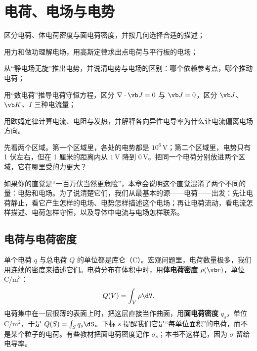 \chapter{电荷、电场与电势}\label{ch:electric}

\begin{chapterguide}
\begin{guidegoals}
\item 区分电荷、体电荷密度与面电荷密度，并按几何选择合适的描述；
\item 用力和做功理解电场，用高斯定律求出点电荷与平行板的电场；
\item 从“静电场无旋”推出电势，并说清电势与电场的区别：哪个依赖参考点，哪个推动电荷；
\item 用“数电荷”推导电荷守恒方程，区分 $\nabla\cdot\vb J=0$ 与 $\vb J=0$，区分 $\vb J$、$\vb K$、$I$ 三种电流量；
\item 用欧姆定律计算电流、电阻与发热，并解释各向异性电导率为什么让电流偏离电场方向。
\end{guidegoals}
\end{chapterguide}

先看两个区域。第一个区域里，各处的电势都是 $10^6\,\mathrm V$；第二个区域里，电势只有 1 伏左右，但在 1 厘米的距离内从 $1\,\mathrm V$ 降到 $0\,\mathrm V$。把同一个电荷分别放进两个区域，它在哪里受的力更大？

如果你的直觉是“一百万伏当然更危险”，本章会说明这个直觉混淆了两个不同的量：电势和电场。为了说清楚它们，我们从最基本的源——电荷——出发：先让电荷静止，看它产生怎样的电场、电势怎样描述这个电场；再让电荷流动，看电流怎样描述、电荷怎样守恒，以及导体中电流与电场怎样联系。

\section{电荷与电荷密度}\label{sec:electric-charge}

单个电荷 $q$ 与总电荷 $Q$ 的单位都是库仑（C）。宏观问题里，电荷数量极多，我们用连续的密度来描述它们。电荷分布在体积中时，用\textbf{体电荷密度} $\rho(\vb r)$，单位 $\mathrm{C/m^3}$：
\begin{equation}
Q(V)=\int_V\rho\dV .
\label{eq:electric-Qvol}
\end{equation}
电荷集中在一层很薄的表面上时，把这层直接当作曲面，用\textbf{面电荷密度} $q_s$，单位 $\mathrm{C/m^2}$，于是 $Q(S)=\int_Sq_s\dS$。下标 $s$ 提醒我们它是“每单位面积”的电荷，而不是某个粒子的电荷。有些教材把面电荷密度记作 $\sigma_s$；本书不这样记，因为 $\sigma$ 留给电导率。

